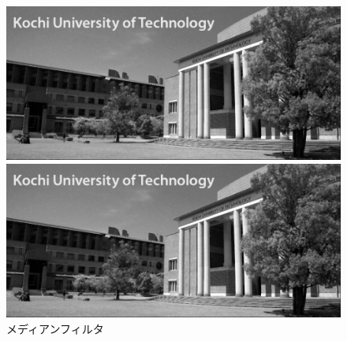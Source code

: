 \begin{figure}[H]
\begin{minipage}[b]{.49\textwidth}
\begin{minipage}[b]{.49\textwidth}
            \includegraphics[keepaspectratio,width=\textwidth]{../../Figures/06_23_mf_img_wgn.png}
            \subcaption{\wgnimg}
        \end{minipage}
        \begin{minipage}[b]{.49\textwidth}
            \includegraphics[keepaspectratio,width=\textwidth]{../../Figures/06_24_mf_img_in.png}
            \subcaption{\inimg}
        \end{minipage}
        \caption{メディアンフィルタ}
    \end{minipage}
\end{figure}
